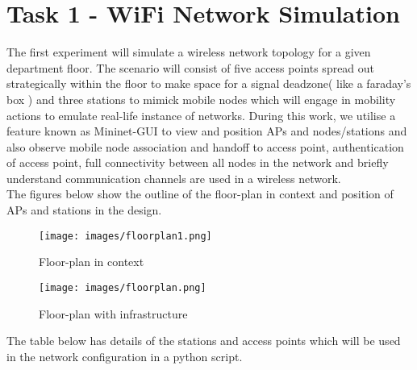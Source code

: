 \documentclass{article}
\begin{document}
\section{Task 1 - WiFi Network Simulation}
The first experiment will simulate a wireless network topology for a given department floor. The scenario will consist of five access points spread out strategically within the floor to make space for a signal deadzone( like a faraday's box ) and three stations to mimick mobile nodes which will engage in mobility actions to emulate real-life instance of networks. During this work, we utilise a feature known as Mininet-GUI to view and position APs and nodes/stations and also observe mobile node association and handoff to access point, authentication of access point, full connectivity between all nodes in the network and briefly understand communication channels are used in a wireless network. \\
The figures below show the outline of the floor-plan in context and position of APs and  stations in the design.
    \begin{figure}[h]
        \centering
        \texttt{[image: images/floorplan1.png]}
        \caption{Floor-plan in context}
        \label{FP}
        \endminipage
        \texttt{[image: images/floorplan.png]}
        \caption{Floor-plan with infrastructure}
        \label{FP-1}
        \endminipage
    \end{figure} 
\par The table below has details of the stations and access points which will be used in the network configuration in a python script.
\end{document}
